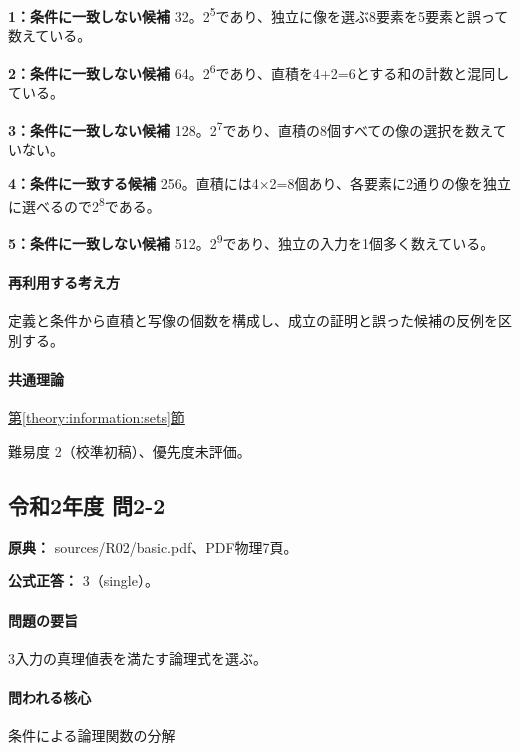 \noindent\textbf{1：条件に一致しない候補} 32。2\textsuperscript{5}であり、独立に像を選ぶ8要素を5要素と誤って数えている。\par

\noindent\textbf{2：条件に一致しない候補} 64。2\textsuperscript{6}であり、直積を4+2=\allowbreak{}6とする和の計数と混同している。\par

\noindent\textbf{3：条件に一致しない候補} 128。2\textsuperscript{7}であり、直積の8個すべての像の選択を数えていない。\par

\noindent\textbf{4：条件に一致する候補} 256。直積には4×2=\allowbreak{}8個あり、各要素に2通りの像を独立に選べるので2\textsuperscript{8}である。\par

\noindent\textbf{5：条件に一致しない候補} 512。2\textsuperscript{9}であり、独立の入力を1個多く数えている。\par

\paragraph{再利用する考え方} 定義と条件から直積と写像の個数を構成し、成立の証明と誤った候補の反例を区別する。

\paragraph{共通理論} \hyperref[theory:information:sets]{第\ref*{theory:information:sets}節}

\par 難易度 2（校準初稿）、優先度未評価。

\subsection{令和2年度 問2-2}
\label{q:r02-reg-basic-2-2}

\noindent\textbf{原典：} sources/R02/basic.pdf、PDF物理7頁。

\textbf{公式正答：} 3（single）。

\paragraph{問題の要旨} 3入力の真理値表を満たす論理式を選ぶ。

\paragraph{問われる核心} 条件による論理関数の分解

